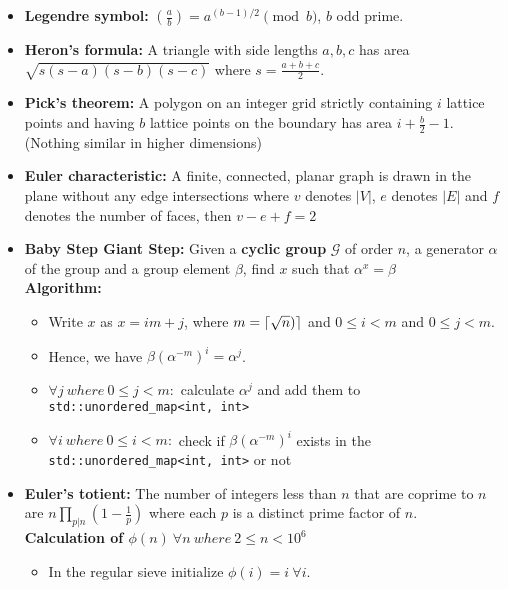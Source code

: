 \documentclass[15pt,a4paper]{article}
\DeclarePairedDelimiter{\ceil}{\lceil}{\rceil}
\begin{document}
\begin{landscape}
\begin{multicols*}{3}
    
\begin{itemize}
    \item \textbf{Legendre symbol:} $\left(\frac{a}{b}\right) = a^{(b-1)/2} \pmod{b}$, $b$ odd prime.
    \item \textbf{Heron's formula:} A triangle with side lengths
    $a,b,c$ has area $\sqrt{s(s-a)(s-b)(s-c)}$ where $s =
    \frac{a+b+c}{2}$.
    \item \textbf{Pick's theorem:} A polygon on an integer grid
    strictly containing $i$ lattice points and having $b$ lattice
    points on the boundary has area $i + \frac{b}{2} - 1$. (Nothing
    similar in higher dimensions)
    \item \textbf{Euler characteristic:} A finite, connected, planar graph is drawn in the plane without any edge intersections where $v$ denotes $|V|$, $e$ denotes $|E|$ and $f$ denotes the number of faces, then $v - e + f = 2$
    \item \textbf{Baby Step Giant Step:} Given a \textbf{cyclic group} $\mathcal{G}$ of order $n$, a generator $\alpha$ of the group and a group element $\beta$, find $x$ such that $\alpha^x = \beta$\\
        \textbf{Algorithm: }\begin{itemize}
            \item Write $x$ as $x = im + j$, where $m = \ceil{\sqrt{n})}$ and $0 \leq i < m$ and $0 \leq j < m$.
            \item Hence, we have $\beta(\alpha^{-m})^{i} = \alpha^j$.
            \item $\forall j\ where\ 0 \leq j < m:$ calculate $\alpha^j$ and add them to \verb!std::unordered_map<int, int>!
            \item $\forall i\ where\ 0 \leq i < m:$ check if $\beta(\alpha^{-m})^{i}$ exists in the \verb|std::unordered_map<int, int>| or not
        \end{itemize}
    \item \textbf{Euler's totient:} The number of integers less than
    $n$ that are coprime to $n$ are $n\prod_{p|n}\left(1 - \frac{1}{p}\right)$
    where each $p$ is a distinct prime factor of $n$.\\
    \textbf{Calculation of $\phi(n)\ \forall n\ where\ 2 \leq n < 10^6$}
        \begin{itemize}
            \item In the regular sieve initialize $\phi(i) = i\ \forall i$.

\end{itemize}
\end{itemize}
\end{multicols*}
\end{landscape}
\end{document}
